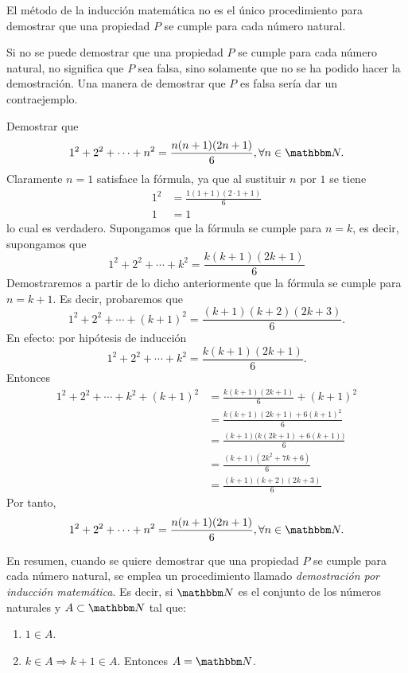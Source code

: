 \begin{remark}
    El método de la inducción matemática no es el único procedimiento para demostrar que una propiedad $P$ se cumple para cada número natural.
\end{remark}

\begin{remark}
    Si no se puede demostrar que una propiedad $P$ se cumple para cada número natural, no significa que $P$ sea falsa, sino solamente que no se ha podido hacer la demostración. Una manera de demostrar que $P$ es falsa sería dar un contraejemplo.
\end{remark}

\begin{example}
    Demostrar que
    $$1^2+2^2+\cdots +n^2=\frac{n(n+1)(2n+1)}{6}, \forall n \in \NN.$$
    \demostracion Claramente $n=1$ satisface la fórmula, ya que al sustituir $n$ por $1$ se tiene
    \begin{align*}
        1^2 &=\frac{1(1+1)(2\cdot 1+1)}{6} \\
        1 &=1
    \end{align*}
    lo cual es verdadero. Supongamos que la fórmula se cumple para $n=k$, es decir, supongamos que
    $$1^2+2^2+\cdots +k^2=\frac{k(k+1)(2k+1)}{6}$$
    Demostraremos a partir de lo dicho anteriormente que la fórmula se cumple para $n=k+1$. Es decir, probaremos que
    $$1^2+2^2+\cdots +(k+1)^2=\frac{(k+1)(k+2)(2k+3)}{6}.$$
    En efecto: por hipótesis de inducción
    $$1^2+2^2+\cdots +k^2=\frac{k(k+1)(2k+1)}{6}.$$\newpage\noindent
    Entonces
    \begin{align*}
        1^2 +2^2+\cdots +k^2+(k+1)^2 &=\frac{k(k+1)(2k+1)}{6}+(k+1)^2 \\
        &=\frac{k(k+1)(2k+1)+6(k+1)^2}{6} \\
        &=\frac{(k+1)\big(k(2k+1)+6(k+1)\big)}{6} \\
        &=\frac{(k+1)(2k^2+7k+6)}{6} \\
        &=\frac{(k+1)(k+2)(2k+3)}{6}
    \end{align*}
    Por tanto,
    $$1^2+2^2+\cdots +n^2=\frac{n(n+1)(2n+1)}{6}, \forall n \in \NN.$$
\end{example}

En resumen, cuando se quiere demostrar que una propiedad $P$ se cumple para cada número natural, se emplea un procedimiento llamado \emph{demostración por inducción matemática}. Es decir, si $\NN$ es el conjunto de los números naturales y $A \subset \NN$ tal que:
\begin{enumerate}[label=\roman*.]
    \item $1 \in A$.
    \item $k \in A \Longrightarrow k+1 \in A$. Entonces $A = \NN$.
\end{enumerate}

